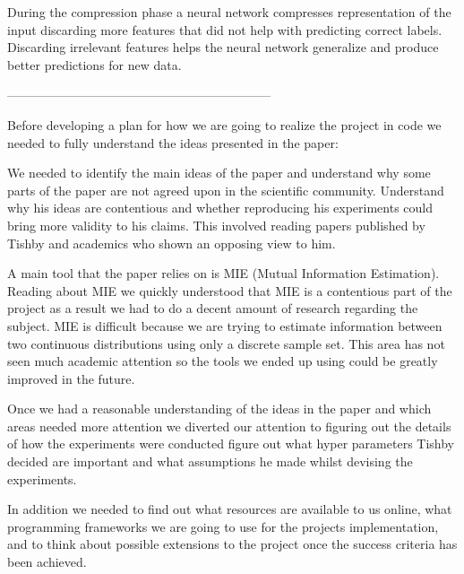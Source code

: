 \documentclass[dissertation.tex]{subfiles}
\begin{document}
During the compression phase a neural network compresses representation of the
input discarding more features that did not help with predicting correct labels.
Discarding irrelevant features helps the neural network generalize and produce
better predictions for new data. 


---------------------------------------------------------------


Before developing a plan for how we are going to realize the project in code we
needed to fully understand the ideas presented in the paper:
\begin{itemize}
    \begin{item}
      We needed to identify the main ideas of the paper and understand why some
      parts of the paper are not agreed upon in the scientific community.
      Understand why his ideas are contentious and whether reproducing his
      experiments could bring more validity to his claims. This involved reading
      papers published by Tishby and academics who shown an opposing view to
      him.
    \end{item}
    \begin{item}
      A main tool that the paper relies on is MIE (Mutual Information
      Estimation). Reading about MIE we quickly understood that MIE is a
      contentious part of the project as a result we had to do a decent amount
      of research regarding the subject. MIE is difficult because we are trying
      to estimate information between two continuous distributions using only a
      discrete sample set. This area has not seen much academic attention so the
      tools we ended up using could be greatly improved in the future.
    \end{item}
\end{itemize}

Once we had a reasonable understanding of the ideas in the paper and which areas
needed more attention we diverted our attention to figuring out the details of
how the experiments were conducted figure out what hyper parameters Tishby
decided are important and what assumptions he made whilst devising the
experiments. 

In addition we needed to find out what resources are available to us online,
what programming frameworks we are going to use for the projects implementation,
and to think about possible extensions to the project once the success criteria
has been achieved.
\end{document}
